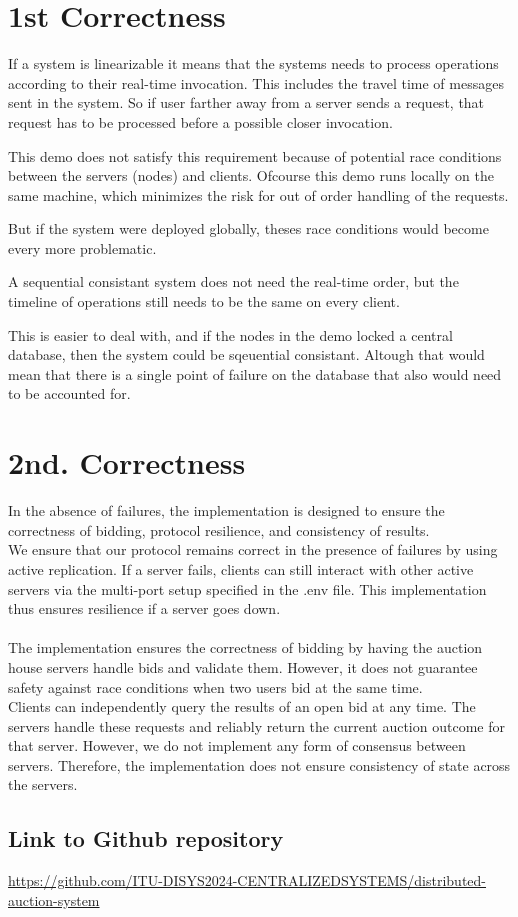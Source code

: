 \documentclass[a4paper,11pt]{article}
\begin{document}
\section{1st Correctness}
If a system is linearizable it means that the systems needs to process operations according to their real-time invocation.
This includes the travel time of messages sent in the system. So if user farther away from a server sends a request,
that request has to be processed before a possible closer invocation.

This demo does not satisfy this requirement because of potential race conditions between the servers (nodes) and clients.
Ofcourse this demo runs locally on the same machine, which minimizes the risk for out of order handling of the requests.

But if the system were deployed globally, theses race conditions would become every more problematic.


A sequential consistant system does not need the real-time order, but the timeline of operations still needs to be the same on every client.

This is easier to deal with, and if the nodes in the demo locked a central database, then the system could be sqeuential consistant.
Altough that would mean that there is a single point of failure on the database that also would need to be accounted for.

\section{2nd. Correctness}
In the absence of failures, the implementation is designed to ensure the correctness of bidding, protocol resilience, and consistency of results.
\\
We ensure that our protocol remains correct in the presence of failures by using active replication. If a server fails, clients can still interact with other active servers via the multi-port setup specified in the .env file. This implementation thus ensures resilience if a server goes down.
\\
\\
The implementation ensures the correctness of bidding by having the auction house servers handle bids and validate them. However, it does not guarantee safety against race conditions when two users bid at the same time.
\\
Clients can independently query the results of an open bid at any time. The servers handle these requests and reliably return the current auction outcome for that server. However, we do not implement any form of consensus between servers. Therefore, the implementation does not ensure consistency of state across the servers.
\\

\subsection*{Link to Github repository}

\href{https://github.com/ITU-DISYS2024-CENTRALIZEDSYSTEMS/distributed-auction-system}{https://github.com/ITU-DISYS2024-CENTRALIZEDSYSTEMS/distributed-auction-system}
\end{document}
